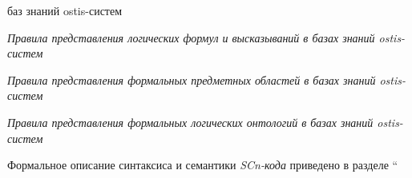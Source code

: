 \begin{SCn}
{\begin{scnvector}
{\begin{scnitemize}
{					            баз знаний ostis-систем}
				            \item \textit{Правила представления логических формул и
					            высказываний в базах знаний ostis-систем}
				            \item \textit{Правила представления формальных
					            предметных областей в базах знаний ostis-систем}
				            \item \textit{Правила представления формальных
					            логических онтологий в базах знаний ostis-систем}
			            \end{scnitemize}}
			\item{Формальное описание синтаксиса и семантики
			            \textit{SCn-кода} приведено в разделе ``}
		\end{scnvector}
	}


\end{SCn}
